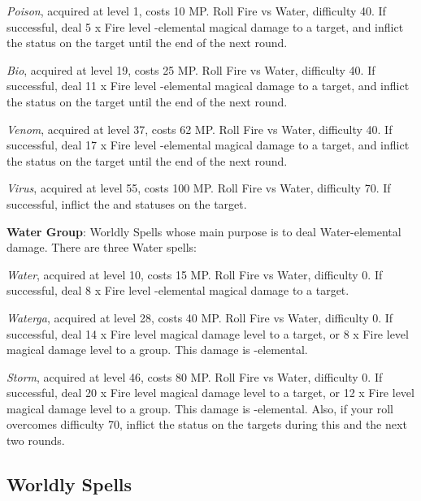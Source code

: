 \begin{multicols}{2}
    \textit{Poison}, acquired at level 1, costs 10 MP\@. Roll Fire vs Water, difficulty 40. If successful, deal 5 x Fire level -elemental magical damage to a target, and inflict the  status on the target until the end of the next round.
    
    \textit{Bio}, acquired at level 19, costs 25 MP\@. Roll Fire vs Water, difficulty 40. If successful, deal 11 x Fire level -elemental magical damage to a target, and inflict the  status on the target until the end of the next round.
    
    \textit{Venom}, acquired at level 37, costs 62 MP\@. Roll Fire vs Water, difficulty 40. If successful, deal 17 x Fire level -elemental magical damage to a target, and inflict the  status on the target until the end of the next round.
    
    \textit{Virus}, acquired at level 55, costs 100 MP\@. Roll Fire vs Water, difficulty 70. If successful, inflict the  and  statuses on the target.

    \ffcrystal[type=level,height=8pt]

    \textbf{Water Group}: Worldly Spells whose main purpose is to deal Water-elemental damage. There are three Water spells:
    
    \textit{Water}, acquired at level 10, costs 15 MP\@. Roll Fire vs Water, difficulty 0. If successful, deal 8 x Fire level -elemental magical damage to a target.
    
    \textit{Waterga}, acquired at level 28, costs 40 MP\@. Roll Fire vs Water, difficulty 0. If successful, deal 14 x Fire level magical damage level to a target, or 8 x Fire level magical damage level to a group. This damage is -elemental.
    
    \textit{Storm}, acquired at level 46, costs 80 MP\@. Roll Fire vs Water, difficulty 0. If successful, deal 20 x Fire level magical damage level to a target, or 12 x Fire level magical damage level to a group. This damage is -elemental. Also, if your roll overcomes difficulty 70, inflict the  status on the targets during this and the next two rounds.

    \subsection{Worldly Spells}\label{subsec:black-worldly}


\end{multicols}
